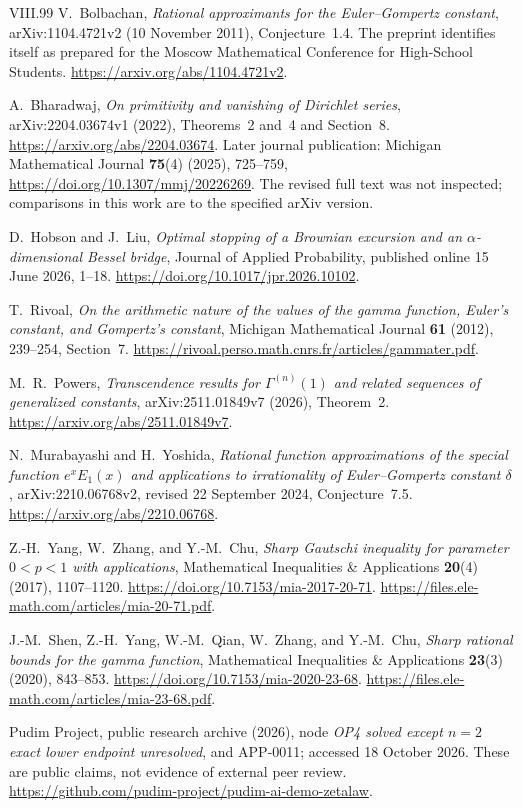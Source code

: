 \documentclass[11pt,a4paper]{article}
\theoremstyle{definition}
\theoremstyle{remark}
\numberwithin{equation}{section}
\begin{document}
\begin{thebibliography}{VIII.99}
V.~Bolbachan, \emph{Rational approximants for the Euler--Gompertz
constant}, arXiv:1104.4721v2 (10 November 2011), Conjecture~1.4.
The preprint identifies itself as prepared for the Moscow Mathematical
Conference for High-School Students.
\url{https://arxiv.org/abs/1104.4721v2}.

A.~Bharadwaj, \emph{On primitivity and vanishing of Dirichlet series},
arXiv:2204.03674v1 (2022), Theorems~2 and~4 and Section~8.
\url{https://arxiv.org/abs/2204.03674}.
Later journal publication: Michigan Mathematical Journal
\textbf{75}(4) (2025), 725--759,
\url{https://doi.org/10.1307/mmj/20226269}.
The revised full text was not inspected; comparisons in this work
are to the specified arXiv version.

D.~Hobson and J.~Liu, \emph{Optimal stopping of a Brownian excursion
and an $\alpha$-dimensional Bessel bridge}, Journal of Applied
Probability, published online 15 June 2026, 1--18.
\url{https://doi.org/10.1017/jpr.2026.10102}.

T.~Rivoal, \emph{On the arithmetic nature of the values of the gamma
function, Euler's constant, and Gompertz's constant},
Michigan Mathematical Journal \textbf{61} (2012), 239--254, Section~7.
\url{https://rivoal.perso.math.cnrs.fr/articles/gammater.pdf}.

M.~R.~Powers, \emph{Transcendence results for $\Gamma^{(n)}(1)$ and
related sequences of generalized constants}, arXiv:2511.01849v7
(2026), Theorem~2.
\url{https://arxiv.org/abs/2511.01849v7}.

N.~Murabayashi and H.~Yoshida, \emph{Rational function approximations
of the special function $e^xE_1(x)$ and applications to irrationality
of Euler--Gompertz constant $\delta$}, arXiv:2210.06768v2,
revised 22 September 2024, Conjecture~7.5.
\url{https://arxiv.org/abs/2210.06768}.

Z.-H.~Yang, W.~Zhang, and Y.-M.~Chu,
\emph{Sharp Gautschi inequality for parameter $0<p<1$ with applications},
Mathematical Inequalities \& Applications \textbf{20}(4) (2017),
1107--1120.
\url{https://doi.org/10.7153/mia-2017-20-71}.
\url{https://files.ele-math.com/articles/mia-20-71.pdf}.

J.-M.~Shen, Z.-H.~Yang, W.-M.~Qian, W.~Zhang, and Y.-M.~Chu,
\emph{Sharp rational bounds for the gamma function},
Mathematical Inequalities \& Applications \textbf{23}(3) (2020),
843--853.
\url{https://doi.org/10.7153/mia-2020-23-68}.
\url{https://files.ele-math.com/articles/mia-23-68.pdf}.

Pudim Project, public research archive (2026), node
\emph{OP4 solved except $n=2$ exact lower endpoint unresolved},
and APP-0011; accessed 18 October 2026. These are public claims,
not evidence of external peer review.
\url{https://github.com/pudim-project/pudim-ai-demo-zetalaw}.
\end{thebibliography}
\end{document}
